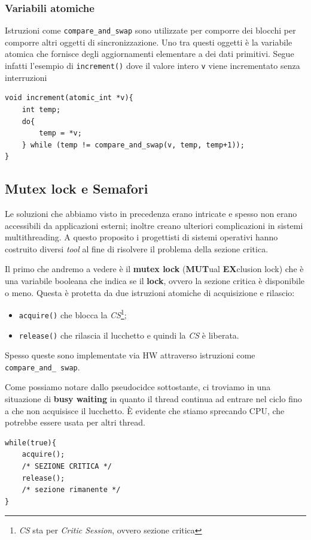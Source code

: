 % 
\subsubsection{Variabili atomiche}
Istruzioni come \texttt{compare\_and\_swap} sono utilizzate per comporre dei blocchi per comporre altri oggetti di sincronizzazione. Uno tra questi oggetti è la variabile atomica che fornisce degli aggiornamenti elementare a dei dati primitivi. Segue infatti l'esempio di \texttt{increment()} dove il valore intero \texttt{v} viene incrementato senza interruzioni
\begin{lstlisting}[caption={Esempio di una variabile atomica \texttt{increment()}}]
void increment(atomic_int *v){
    int temp;
    do{
        temp = *v;
    } while (temp != compare_and_swap(v, temp, temp+1));
}
\end{lstlisting}
% 
\subsection{Mutex lock e Semafori}
Le soluzioni che abbiamo visto in precedenza erano intricate e spesso non erano accessibili da applicazioni esterni; inoltre creano ulteriori complicazioni in sistemi multithreading. A questo proposito i progettisti di sistemi operativi hanno costruito diversi \textit{tool} al fine di risolvere il problema della sezione critica.

Il primo che andremo a vedere è il \textbf{mutex lock} (\textbf{MUT}ual \textbf{EX}clusion lock) che è una variabile booleana che indica se il \textbf{lock}, ovvero la sezione critica è disponibile o meno. Questa è protetta da due istruzioni atomiche di acquisizione e rilascio:
\vspace{-5px}
\begin{itemize}
\setlength{\itemsep}{-.15 em}
    \item \texttt{acquire()} che blocca la \textit{CS}\footnote{\textit{CS} sta per \textit{Critic Session}, ovvero sezione critica};
    \item \texttt{release()} che rilascia il lucchetto e quindi la \textit{CS} è liberata.
\end{itemize}
Spesso queste sono implementate via HW attraverso istruzioni come \texttt{compare\_and\_ swap}.

Come possiamo notare dallo pseudocidce sottostante, ci troviamo in una situazione di \textbf{busy waiting} in quanto il thread continua ad entrare nel ciclo fino a che non acquisisce il lucchetto. È evidente che stiamo sprecando CPU, che potrebbe essere usata per altri thread.
\begin{lstlisting}
while(true){
    acquire();
    /* SEZIONE CRITICA */
    release();
    /* sezione rimanente */
}
\end{lstlisting}

